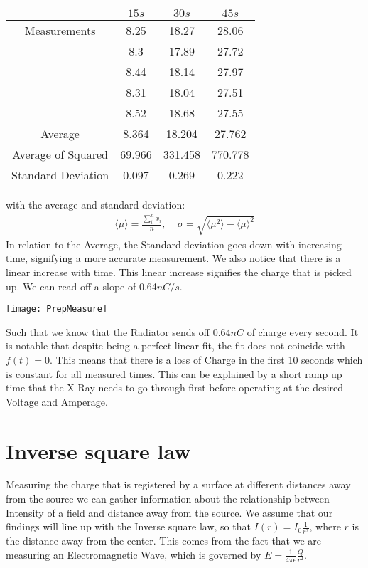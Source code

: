 \documentclass[]{scrartcl}
\begin{document}
\begin{center}
	\begin{tabular}{||c||c|c|c||}
	\hline
		 & $15s$ & $30s$ & $45s$\\
	\hline
		Measurements & 8.25 & 18.27 & 28.06 \\
		     	& 8.3 & 17.89 & 27.72 \\
			& 8.44 & 18.14 & 27.97\\
			& 8.31 & 18.04 & 27.51\\
			& 8.52 & 18.68 & 27.55\\
	\hline
		Average & 8.364 & 18.204 & 27.762\\
	\hline
		Average of Squared & 69.966 & 331.458 & 770.778\\
	\hline
		Standard Deviation & 0.097 & 0.269 & 0.222\\
	\hline
	\end{tabular}
\end{center}
with the average and standard deviation:
\begin{gather}
	\langle\mu\rangle = \frac{\sum_i^n x_i}{n},\;\;\;\;
	\sigma = \sqrt{\langle\mu^2\rangle - \langle\mu\rangle^2}
\end{gather}
In relation to the Average, the Standard deviation goes down with increasing time, signifying a more accurate measurement. We also notice that there is a linear increase with time. This linear increase signifies the charge that is picked up. We can read off a slope of 0.64$nC/s$.

\begin{centering}
\texttt{[image: PrepMeasure]}
\end{centering}
Such that we know that the Radiator sends off $0.64nC$ of charge every second. It is notable that despite being a perfect linear fit, the fit does not coincide with $f(t)=0$. This means that there is a loss of Charge in the first 10 seconds which is constant for all measured times. This can be explained by a short ramp up time that the X-Ray needs to go through first before operating at the desired Voltage and Amperage.
\section{Inverse square law}


Measuring the charge that is registered by a surface at different distances away from the source we can gather information about the relationship between Intensity of a field and distance away from the source. We assume that our findings will line up with the Inverse square law, so that $I(r) = I_0\frac{1}{r^2}$, where $r$ is the distance away from the center. This comes from the fact that we are measuring an Electromagnetic Wave, which is governed by $E = \frac{1}{4\pi\epsilon}\frac{Q}{r^2}$.\\
\end{document}
